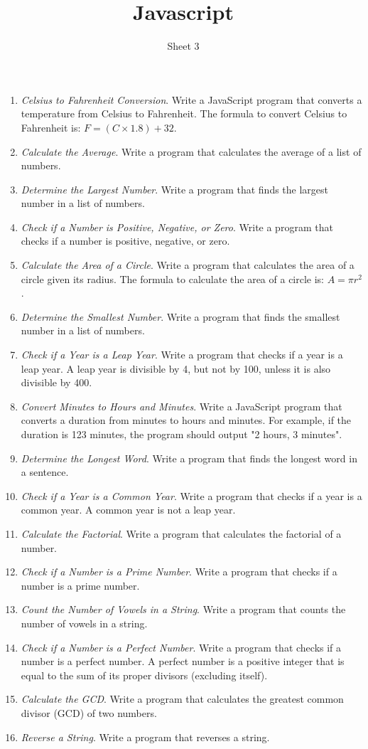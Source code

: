 \documentclass{article}
\title{Javascript}
\author{Sheet 3}
\date{}
\begin{document}
\maketitle

\begin{enumerate}
	\item  \textit{Celsius to Fahrenheit Conversion}. Write a JavaScript program that converts a temperature from Celsius to Fahrenheit. The formula to convert Celsius to Fahrenheit is: $F = (C \times 1.8) + 32$.
	\item \textit{Calculate the Average}. Write a program that calculates the average of a list of numbers.
	\item \textit{Determine the Largest Number}. Write a program that finds the largest number in a list of numbers.
	\item \textit{Check if a Number is Positive, Negative, or Zero}. Write a program that checks if a number is positive, negative, or zero.
	\item \textit{Calculate the Area of a Circle}. Write a program that calculates the area of a circle given its radius. The formula to calculate the area of a circle is: $A = \pi r^2$.
	\item \textit{Determine the Smallest Number}. Write a program that finds the smallest number in a list of numbers.
	\item \textit{Check if a Year is a Leap Year}. Write a program that checks if a year is a leap year. A leap year is divisible by 4, but not by 100, unless it is also divisible by 400.
	\item \textit{Convert Minutes to Hours and Minutes}. Write a JavaScript program that converts a duration from minutes to hours and minutes. For example, if the duration is 123 minutes, the program should output "2 hours, 3 minutes".
	\item \textit{Determine the Longest Word}. Write a program that finds the longest word in a sentence.
	\item \textit{Check if a Year is a Common Year}. Write a program that checks if a year is a common year. A common year is not a leap year.
	\item \textit{Calculate the Factorial}. Write a program that calculates the factorial of a number.
	\item \textit{Check if a Number is a Prime Number}. Write a program that checks if a number is a prime number.
	\item \textit{Count the Number of Vowels in a String}. Write a program that counts the number of vowels in a string.
	\item \textit{Check if a Number is a Perfect Number}. Write a program that checks if a number is a perfect number. A perfect number is a positive integer that is equal to the sum of its proper divisors (excluding itself).
	\item \textit{Calculate the GCD}. Write a program that calculates the greatest common divisor (GCD) of two numbers.
	\item \textit{Reverse a String}. Write a program that reverses a string.


\end{enumerate}
\end{document}
